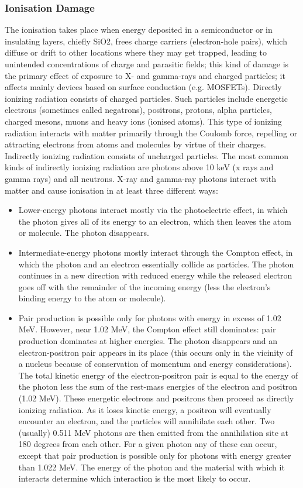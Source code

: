 \documentclass[./dissertation.tex]{subfiles}
\begin{document}
\subsubsection{Ionisation Damage}
The ionisation takes place when energy deposited in a semiconductor or in insulating
layers, chiefly SiO2, frees charge carriers (electron-hole pairs), which diffuse or drift
to other locations where they may get trapped, leading to unintended concentrations
of charge and parasitic fields; this kind of damage is the primary effect of exposure
to X- and gamma-rays and charged particles; it affects mainly devices based on surface conduction (e.g. MOSFETs)\cite{bib1}. Directly ionizing radiation consists of charged
particles. Such particles include energetic electrons (sometimes called negatrons),
positrons, protons, alpha particles, charged mesons, muons and heavy ions (ionised
atoms). This type of ionizing radiation interacts with matter primarily through the
Coulomb force, repelling or attracting electrons from atoms and molecules by virtue of
their charges. Indirectly ionizing radiation consists of uncharged particles. The most
common kinds of indirectly ionizing radiation are photons above 10 keV (x rays and
gamma rays) and all neutrons. X-ray and gamma-ray photons interact with matter
and cause ionisation in at least three different ways:
\begin{itemize}

\item Lower-energy photons interact mostly via the photoelectric effect, in which the
photon gives all of its energy to an electron, which then leaves the atom or
molecule. The photon disappears.
\item Intermediate-energy photons mostly interact through the Compton effect, in
which the photon and an electron essentially collide as particles. The photon
continues in a new direction with reduced energy while the released electron
goes off with the remainder of the incoming energy (less the electron's binding
energy to the atom or molecule).
\item Pair production is possible only for photons with energy in excess of 1.02 MeV.
However, near 1.02 MeV, the Compton effect still dominates: pair production
dominates at higher energies. The photon disappears and an electron-positron
pair appears in its place (this occurs only in the vicinity of a nucleus because
of conservation of momentum and energy considerations). The total kinetic
energy of the electron-positron pair is equal to the energy of the photon less the
sum of the rest-mass energies of the electron and positron (1.02 MeV). These
energetic electrons and positrons then proceed as directly ionizing radiation. As
it loses kinetic energy, a positron will eventually encounter an electron, and the
particles will annihilate each other. Two (usually) 0.511 MeV photons are then
emitted from the annihilation site at 180 degrees from each other. For a given
photon any of these can occur, except that pair production is possible only for
photons with energy greater than 1.022 MeV. The energy of the photon and the
material with which it interacts determine which interaction is the most likely
to occur\cite{bib8}.
\end{itemize}
\end{document}
